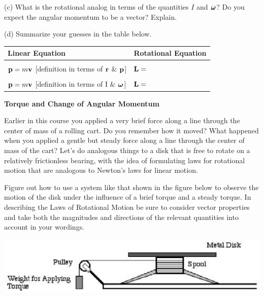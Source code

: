 (c) What is the rotational analog in terms of the quantities $I$ and \( 
\mbox{\boldmath$\omega$}  \)?
Do you expect the angular momentum to be a vector? Explain.
\vspace{20mm}

(d) Summarize your guesses in the table below.

\vspace{0.3cm}
{\centering \begin{tabular}{|p{7cm}|p{5cm}|}
\hline 
Linear Equation &
Rotational Equation \\
\hline 
\hline 
&
\\
\( {\bf p}=m{\bf v} \) {[}definition in terms of \( {\bf r} \)
\& \( {\bf p} \){]}&
\( {\bf L}= \)\\
\hline 
&
\\
\( {\bf p}=m{\bf v} \) {[}definition in terms of I \&
\( { \mbox{\boldmath$\omega$} } \){]}&
\( {\bf L}= \)\\
\hline 
\end{tabular}\par}
\vspace{0.3cm}

\textbf{Torque and Change of Angular Momentum }

Earlier in this course you applied a very brief force along a line through the
center of mass of a rolling cart. Do you remember how it moved? What happened
when you applied a gentle but steady force along a line through the center of
mass of the cart? Let's do analogous things to a disk that is free to rotate
on a relatively frictionless bearing, with the idea of formulating laws for
rotational motion that are analogous to Newton's laws for linear motion. 

Figure out how to use a system like that shown in the figure below to observe
the motion of the disk under the influence of a brief torque and a steady torque.
In describing the Laws of Rotational Motion be sure to consider vector properties
and take both the magnitudes and directions of the relevant quantities into
account in your wordings. 

\vspace{0.3cm}
{\par\centering \includegraphics{ang_mom_fig6.eps} \par}
\vspace{0.3cm}

